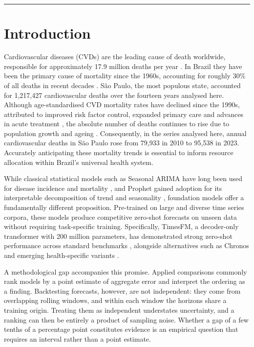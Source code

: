 \vspace{1em}
\hrule

\section{Introduction}

Cardiovascular diseases (CVDs) are the leading cause of death worldwide, responsible for
approximately 17.9 million deaths per year \citep{roth2020}. In Brazil they have been the
primary cause of mortality since the 1960s, accounting for roughly 30\% of all deaths in
recent decades \citep{oliveira2020, brant2017}. S\~ao Paulo, the most populous state,
accounted for 1{,}217{,}427 cardiovascular deaths over the fourteen years analysed here.
Although age-standardised CVD mortality rates have declined since the 1990s, attributed to
improved risk factor control, expanded primary care and advances in acute treatment
\citep{ribeiro2016}, the absolute number of deaths continues to rise due to population growth
and ageing \citep{brant2025}. Consequently, in the series analysed here, annual
cardiovascular deaths in S\~ao Paulo rose from 79{,}933 in 2010 to 95{,}538 in 2023.
Accurately anticipating these mortality trends is essential to inform resource allocation
within Brazil's universal health system.

While classical statistical models such as Seasonal ARIMA have long been used for disease
incidence and mortality \citep{box2015}, and Prophet gained adoption for its interpretable
decomposition of trend and seasonality \citep{taylor2018}, foundation models offer a
fundamentally different proposition. Pre-trained on large and diverse time series corpora,
these models produce competitive zero-shot forecasts on unseen data without requiring
task-specific training. Specifically, TimesFM, a decoder-only transformer with 200 million
parameters, has demonstrated strong zero-shot performance across standard benchmarks
\citep{das2024}, alongside alternatives such as Chronos \citep{ansari2024} and emerging
health-specific variants \citep{li2025}.

A methodological gap accompanies this promise. Applied comparisons commonly rank models by
a point estimate of aggregate error and interpret the ordering as a finding. Backtesting
forecasts, however, are not independent: they come from overlapping rolling windows, and
within each window the horizons share a training origin. Treating them as independent
understates uncertainty, and a ranking can then be entirely a product of sampling noise.
Whether a gap of a few tenths of a percentage point constitutes evidence is an empirical
question that requires an interval rather than a point estimate.

